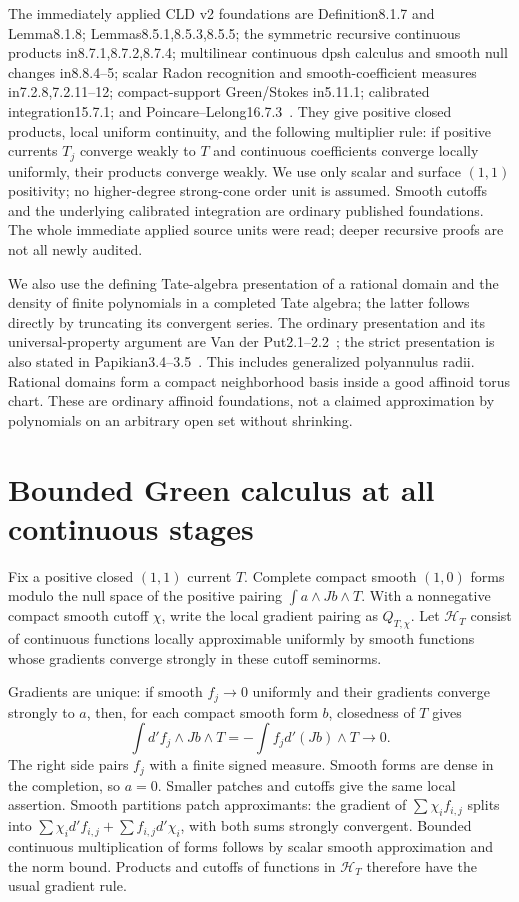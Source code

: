 \documentclass[11pt]{article}
\begin{document}
The immediately applied CLD v2 foundations are Definition8.1.7 and
Lemma8.1.8; Lemmas8.5.1,8.5.3,8.5.5; the symmetric recursive continuous
products in8.7.1,8.7.2,8.7.4; multilinear continuous dpsh calculus and
smooth null changes in8.8.4--5; scalar Radon recognition and
smooth-coefficient measures in7.2.8,7.2.11--12; compact-support
Green/Stokes in5.11.1; calibrated integration15.7.1; and
Poincare--Lelong16.7.3~\cite{CLD}.
They give positive closed products, local uniform continuity, and the
following multiplier rule: if positive currents $T_j$ converge weakly
to $T$ and continuous coefficients converge locally uniformly, their
products converge weakly. We use only scalar and surface $(1,1)$
positivity; no higher-degree strong-cone order unit is assumed.
Smooth cutoffs and the underlying calibrated integration are ordinary
published foundations. The whole immediate applied source units were
read; deeper recursive proofs are not all newly audited.

We also use the defining Tate-algebra presentation of a rational domain
and the density of finite polynomials in a completed Tate algebra;
the latter follows directly by truncating its convergent series.
The ordinary presentation and its universal-property argument are
Van der Put2.1--2.2~\cite{VdP}; the strict presentation is also stated
in Papikian3.4--3.5~\cite{Pap}.
This includes generalized polyannulus radii. Rational domains form a
compact neighborhood basis inside a good affinoid torus chart.
These are ordinary affinoid foundations, not a claimed approximation
by polynomials on an arbitrary open set without shrinking.

\section{Bounded Green calculus at all continuous stages}
Fix a positive closed $(1,1)$ current $T$. Complete compact smooth
$(1,0)$ forms modulo the null space of the positive pairing
$\int a\wedge Jb\wedge T$. With a nonnegative compact smooth cutoff
$\chi$, write the local gradient pairing as $Q_{T,\chi}$.
Let $\mathscr H_T$ consist of continuous functions locally approximable
uniformly by smooth functions whose gradients converge strongly in
these cutoff seminorms.

Gradients are unique: if smooth $f_j\to0$ uniformly and their gradients
converge strongly to $a$, then, for each compact smooth form $b$,
closedness of $T$ gives
\[
 \int d'f_j\wedge Jb\wedge T
 =-\int f_jd'(Jb)\wedge T\longrightarrow0.
\]
The right side pairs $f_j$ with a finite signed measure. Smooth forms
are dense in the completion, so $a=0$. Smaller patches and cutoffs
give the same local assertion. Smooth partitions patch approximants:
the gradient of $\sum\chi_i f_{i,j}$ splits into
$\sum\chi_i d'f_{i,j}+\sum f_{i,j}d'\chi_i$, with both sums strongly
convergent. Bounded continuous multiplication of forms follows by
scalar smooth approximation and the norm bound. Products and cutoffs
of functions in $\mathscr H_T$ therefore have the usual gradient rule.
\end{document}
